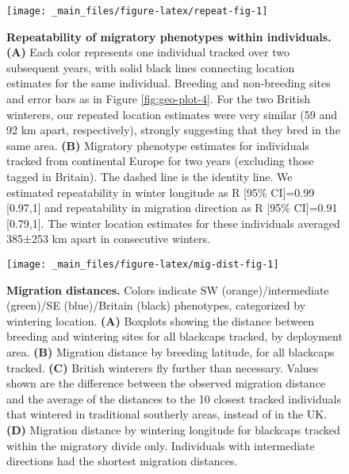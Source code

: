 \documentclass[a4paper, nobind]{templates/ociamthesis}
\begin{document}
\begin{figure}
\texttt{[image: \_main\_files/figure-latex/repeat-fig-1]} \caption{\textbf{Repeatability of migratory phenotypes within individuals.} \textbf{(A)} Each color represents one individual tracked over two subsequent years, with solid black lines connecting location estimates for the same individual. Breeding and non-breeding sites and error bars as in Figure \ref{fig:geo-plot-4}. For the two British winterers, our repeated location estimates were very similar (59 and 92 km apart, respectively), strongly suggesting that they bred in the same area. \textbf{(B)} Migratory phenotype estimates for individuals tracked from continental Europe for two years (excluding those tagged in Britain). The dashed line is the identity line. We estimated repeatability in winter longitude as R {[}95\% CI{]}=0.99 {[}0.97,1{]} and repeatability in migration direction as R {[}95\% CI{]}=0.91 {[}0.79,1{]}. The winter location estimates for these individuals averaged 385±253 km apart in consecutive winters.}\label{fig:repeat-fig}
\end{figure}



\begin{figure}
\texttt{[image: \_main\_files/figure-latex/mig-dist-fig-1]} \caption{\textbf{Migration distances.} Colors indicate SW (orange)/intermediate (green)/SE (blue)/Britain (black) phenotypes, categorized by wintering location. \textbf{(A)} Boxplots showing the distance between breeding and wintering sites for all blackcaps tracked, by deployment area. \textbf{(B)} Migration distance by breeding latitude, for all blackcaps tracked. \textbf{(C)} British winterers fly further than necessary. Values shown are the difference between the observed migration distance and the average of the distances to the 10 closest tracked individuals that wintered in traditional southerly areas, instead of in the UK. \textbf{(D)} Migration distance by wintering longitude for blackcaps tracked within the migratory divide only. Individuals with intermediate directions had the shortest migration distances.}\label{fig:mig-dist-fig}
\end{figure}
\end{document}
